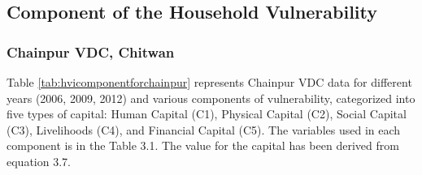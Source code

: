 \subsection{Component of the Household Vulnerability}
\subsubsection{Chainpur VDC, Chitwan}
Table \ref{tab:hvicomponentforchainpur} represents Chainpur VDC data for different years (2006, 2009, 2012) and various components of vulnerability, categorized into five types of capital: Human Capital (C1), Physical Capital (C2), Social Capital (C3), Livelihoods (C4), and Financial Capital (C5). The variables used in each component is in the Table 3.1. The value for the capital has been derived from equation 3.7.

